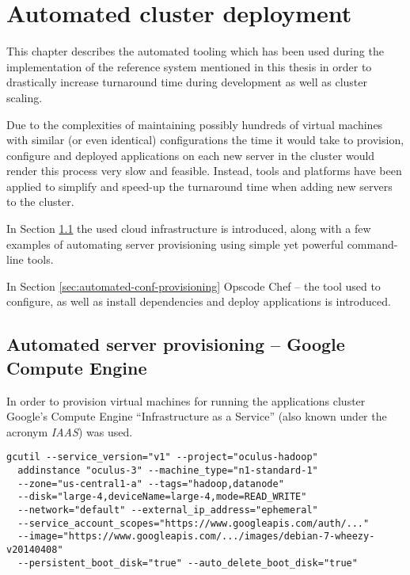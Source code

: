 \chapter{Automated cluster deployment}
\label{app:chef}
This chapter describes the automated tooling which has been used during the implementation of the reference system mentioned in this thesis in order to drastically increase turnaround time during development as well as cluster scaling.

Due to the complexities of maintaining possibly hundreds of virtual machines with similar (or even identical) configurations the time it would take to provision, configure and deployed applications on each new server in the cluster would render this process very slow and feasible. Instead, tools and platforms have been applied to simplify and speed-up the turnaround time when adding new servers to the cluster. 

In Section \ref{sec:automated-server-provisioning} the used cloud infrastructure is introduced, along with a few examples of automating server provisioning using simple yet powerful command-line tools. 

In Section \ref{sec:automated-conf-provisioning} Opscode Chef -- the tool used to configure, as well as install dependencies and deploy applications is introduced.

\newpage
\section{Automated server provisioning -- Google Compute Engine}
\label{sec:automated-server-provisioning}

In order to provision virtual machines for running the applications cluster Google's Compute Engine ``Infrastructure as a Service'' (also known under the acronym \textit{IAAS}) was used.

\begin{lstlisting}[caption={Creating new instance on GCE}, label={lst:new-gce-instance-bash}]
gcutil --service_version="v1" --project="oculus-hadoop" 
  addinstance "oculus-3" --machine_type="n1-standard-1" 
  --zone="us-central1-a" --tags="hadoop,datanode"
  --disk="large-4,deviceName=large-4,mode=READ_WRITE"
  --network="default" --external_ip_address="ephemeral" 
  --service_account_scopes="https://www.googleapis.com/auth/..." 
  --image="https://www.googleapis.com/.../images/debian-7-wheezy-v20140408" 
  --persistent_boot_disk="true" --auto_delete_boot_disk="true"
\end{lstlisting}



